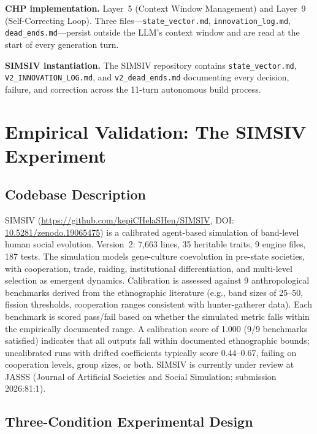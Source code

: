 \documentclass[11pt,a4paper]{article}
\begin{document}
\textbf{CHP implementation.} Layer~5 (Context Window Management) and Layer~9 (Self-Correcting Loop). Three files---\texttt{state\_vector.md}, \texttt{innovation\_log.md}, \texttt{dead\_ends.md}---persist outside the LLM's context window and are read at the start of every generation turn.

\textbf{SIMSIV instantiation.} The SIMSIV repository contains \texttt{state\_vector.md}, \texttt{V2\_INNOVATION\_LOG.md}, and \texttt{v2\_dead\_ends.md} documenting every decision, failure, and correction across the 11-turn autonomous build process.

\section{Empirical Validation: The SIMSIV Experiment}

\subsection{Codebase Description}

SIMSIV (\url{https://github.com/kepiCHelaSHen/SIMSIV}, DOI: \href{https://doi.org/10.5281/zenodo.19065475}{10.5281/zenodo.19065475}) is a calibrated agent-based simulation of band-level human social evolution. Version~2: 7,663 lines, 35 heritable traits, 9 engine files, 187 tests. The simulation models gene-culture coevolution in pre-state societies, with cooperation, trade, raiding, institutional differentiation, and multi-level selection as emergent dynamics. Calibration is assessed against 9 anthropological benchmarks derived from the ethnographic literature (e.g., band sizes of 25--50, fission thresholds, cooperation ranges consistent with hunter-gatherer data). Each benchmark is scored pass/fail based on whether the simulated metric falls within the empirically documented range. A calibration score of 1.000 (9/9 benchmarks satisfied) indicates that all outputs fall within documented ethnographic bounds; uncalibrated runs with drifted coefficients typically score 0.44--0.67, failing on cooperation levels, group sizes, or both. SIMSIV is currently under review at JASSS (Journal of Artificial Societies and Social Simulation; submission 2026:81:1).

\subsection{Three-Condition Experimental Design}
\end{document}
